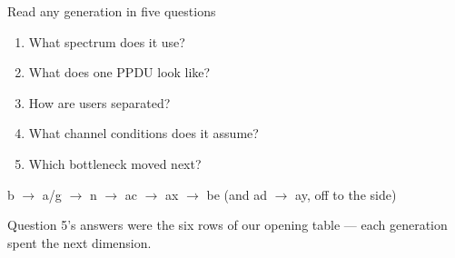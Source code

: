 \begin{frame}{Read any generation in five questions}
  \vspace{0.4em}
  \begin{enumerate}\itemsep6pt\large
    \item What spectrum does it use?
    \item What does one PPDU look like?
    \item How are users separated?
    \item What channel conditions does it assume?
    \item Which bottleneck moved next?
  \end{enumerate}

  \vspace{0.6em}
  \centering
  {\large\textcolor{ranblue}{b $\to$ a/g $\to$ n $\to$ ac $\to$ ax $\to$ be}
   \quad\textcolor{coreorange}{(and ad $\to$ ay, off to the side)}\par}

  \vspace{0.4em}
  {\small\textcolor{softgray}{Question 5's answers were the six rows of our opening
    table --- each generation spent the next dimension.}\par}

  \vspace{0.4em}
\end{frame}
